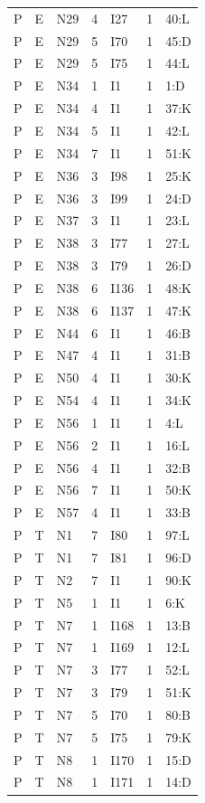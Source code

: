 {\begin{longtable}{lllrlrp{.35\linewidth}}
P & E & N29 & 4 & I27 & 1 & 40:L \\
P & E & N29 & 5 & I70 & 1 & 45:D \\
P & E & N29 & 5 & I75 & 1 & 44:L \\
P & E & N34 & 1 & I1 & 1 & 1:D \\
P & E & N34 & 4 & I1 & 1 & 37:K \\
P & E & N34 & 5 & I1 & 1 & 42:L \\
P & E & N34 & 7 & I1 & 1 & 51:K \\
P & E & N36 & 3 & I98 & 1 & 25:K \\
P & E & N36 & 3 & I99 & 1 & 24:D \\
P & E & N37 & 3 & I1 & 1 & 23:L \\
P & E & N38 & 3 & I77 & 1 & 27:L \\
P & E & N38 & 3 & I79 & 1 & 26:D \\
P & E & N38 & 6 & I136 & 1 & 48:K \\
P & E & N38 & 6 & I137 & 1 & 47:K \\
P & E & N44 & 6 & I1 & 1 & 46:B \\
P & E & N47 & 4 & I1 & 1 & 31:B \\
P & E & N50 & 4 & I1 & 1 & 30:K \\
P & E & N54 & 4 & I1 & 1 & 34:K \\
P & E & N56 & 1 & I1 & 1 & 4:L \\
P & E & N56 & 2 & I1 & 1 & 16:L \\
P & E & N56 & 4 & I1 & 1 & 32:B \\
P & E & N56 & 7 & I1 & 1 & 50:K \\
P & E & N57 & 4 & I1 & 1 & 33:B \\
P & T & N1 & 7 & I80 & 1 & 97:L \\
P & T & N1 & 7 & I81 & 1 & 96:D \\
P & T & N2 & 7 & I1 & 1 & 90:K \\
P & T & N5 & 1 & I1 & 1 & 6:K \\
P & T & N7 & 1 & I168 & 1 & 13:B \\
P & T & N7 & 1 & I169 & 1 & 12:L \\
P & T & N7 & 3 & I77 & 1 & 52:L \\
P & T & N7 & 3 & I79 & 1 & 51:K \\
P & T & N7 & 5 & I70 & 1 & 80:B \\
P & T & N7 & 5 & I75 & 1 & 79:K \\
P & T & N8 & 1 & I170 & 1 & 15:D \\
P & T & N8 & 1 & I171 & 1 & 14:D \\

\end{longtable}}
